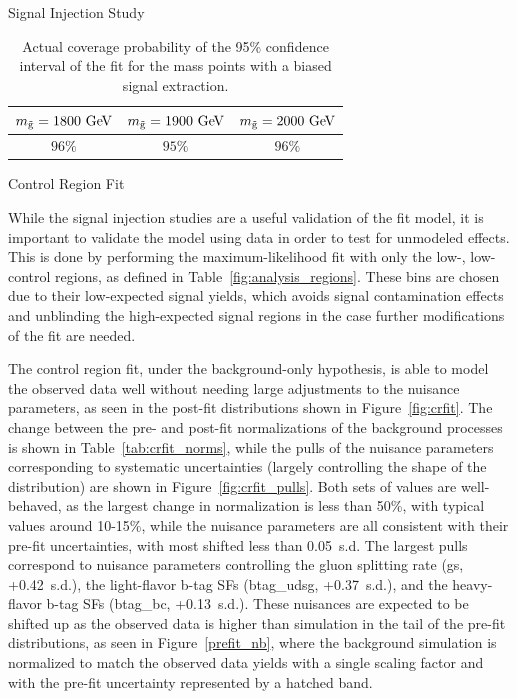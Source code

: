 \begin{section}{Signal Injection Study}
\begin{table}[tbp!]
\centering
\begin{tabular}{ |c|c|c| }
\hline
$m_{\tilde{\mathrm{g}}} = 1800~\mathrm{Ge\kern -0.1em V}$ & $m_{\tilde{\mathrm{g}}} = 1900~\mathrm{Ge\kern -0.1em V}$ & $m_{\tilde{\mathrm{g}}} = 2000~\mathrm{Ge\kern -0.1em V}$ \\ \hline
$96\%$              & $95\%$              & $96\%$              \\ \hline
\end{tabular}
\caption{Actual coverage probability of the 95\% confidence interval of the fit for the mass points with a biased signal extraction.}
\label{tab:siginj_coverage}
\end{table}

\end{section}

\begin{section}{Control Region Fit}
\label{sec:crfit}

While the signal injection studies are a useful validation of the fit model, it is important to validate the model using data in order to test for unmodeled effects.
This is done by performing the maximum-likelihood fit with only the low-\Njets, low-\MJ control regions, as defined in Table~\ref{fig:analysis_regions}.
These bins are chosen due to their low-expected signal yields, which avoids signal contamination effects and unblinding the high-expected signal regions in the case further modifications of the fit are needed.

The control region fit, under the background-only hypothesis, is able to model the observed data well without needing large adjustments to the nuisance parameters, as seen in the post-fit \Nb distributions shown in Figure~\ref{fig:crfit}.
The change between the pre- and post-fit normalizations of the background processes is shown in Table~\ref{tab:crfit_norms}, while the pulls of the nuisance parameters corresponding to systematic uncertainties (largely controlling the shape of the \Nb distribution) are shown in Figure~\ref{fig:crfit_pulls}.
Both sets of values are well-behaved, as the largest change in normalization is less than 50\%, with typical values around 10-15\%, while the nuisance parameters are all consistent with their pre-fit uncertainties, with most shifted less than 0.05~s.d.
The largest pulls correspond to nuisance parameters controlling the gluon splitting rate (gs, +0.42~s.d.), the light-flavor b-tag SFs (btag\_udsg, +0.37~s.d.), and the heavy-flavor b-tag SFs (btag\_bc, +0.13~s.d.).
These nuisances are expected to be shifted up as the observed data is higher than simulation in the tail of the pre-fit \Nb distributions, as seen in Figure~\ref{prefit_nb}, where the background simulation is normalized to match the observed data yields with a single scaling factor and with the pre-fit uncertainty represented by a hatched band.


\end{section}

